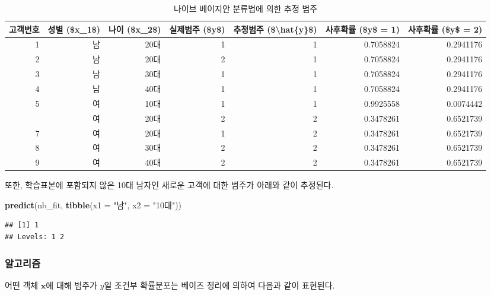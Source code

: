 \documentclass[]{book}
\newenvironment{Shaded}{\begin{snugshade}}{\end{snugshade}}
\newcommand{\DataTypeTok}[1]{\textcolor[rgb]{0.13,0.29,0.53}{#1}}
\newcommand{\KeywordTok}[1]{\textcolor[rgb]{0.13,0.29,0.53}{\textbf{#1}}}
\newcommand{\NormalTok}[1]{#1}
\newcommand{\StringTok}[1]{\textcolor[rgb]{0.31,0.60,0.02}{#1}}
\begin{document}
\begin{table}[t]

\caption{\label{tab:naive-bayes-posterior}나이브 베이지안 분류법에 의한 추정 범주}
\centering
\begin{tabular}{rrrrrrr}
\toprule
고객번호 & 성별 (\$x\_1\$) & 나이 (\$x\_2\$) & 실제범주 (\$y\$) & 추정범주 (\$\textbackslash{}hat\{y\}\$) & 사후확률 (\$y\$ = 1) & 사후확률 (\$y\$ = 2)\\
\midrule
1 & 남 & 20대 & 1 & 1 & 0.7058824 & 0.2941176\\
2 & 남 & 20대 & 2 & 1 & 0.7058824 & 0.2941176\\
3 & 남 & 30대 & 1 & 1 & 0.7058824 & 0.2941176\\
4 & 남 & 40대 & 1 & 1 & 0.7058824 & 0.2941176\\
5 & 여 & 10대 & 1 & 1 & 0.9925558 & 0.0074442\\
\addlinespace
6 & 여 & 20대 & 2 & 2 & 0.3478261 & 0.6521739\\
7 & 여 & 20대 & 1 & 2 & 0.3478261 & 0.6521739\\
8 & 여 & 30대 & 2 & 2 & 0.3478261 & 0.6521739\\
9 & 여 & 40대 & 2 & 2 & 0.3478261 & 0.6521739\\
\bottomrule
\end{tabular}
\end{table}

또한, 학습표본에 포함되지 않은 10대 남자인 새로운 고객에 대한 범주가 아래와 같이 추정된다.

\begin{Shaded}
\begin{Highlighting}[]
\KeywordTok{predict}\NormalTok{(nb_fit, }\KeywordTok{tibble}\NormalTok{(}\DataTypeTok{x1 =} \StringTok{"남"}\NormalTok{, }\DataTypeTok{x2 =} \StringTok{"10대"}\NormalTok{))}
\end{Highlighting}
\end{Shaded}

\begin{verbatim}
## [1] 1
## Levels: 1 2
\end{verbatim}

\hypertarget{naive-bayes-algorithm}{%
\subsubsection{알고리즘}\label{naive-bayes-algorithm}}

어떤 객체 \(\mathbf{x}\)에 대해 범주가 \(y\)일 조건부 확률분포는 베이즈 정리에 의하여 다음과 같이 표현된다.
\end{document}
